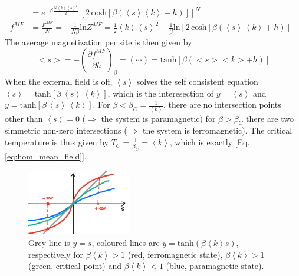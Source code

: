 {\begin{align*}
    &= e^{-\beta \frac{N \left\langle k \right \rangle\left\langle s \right \rangle^2}{2}}\,\left[2\,\text{cosh}\left[\beta(\left\langle s \right \rangle\left\langle k \right \rangle+h)\right]\right]^N \\
   f^{MF}&= \frac{F^{MF}}{N} = - \frac{1}{N\beta}\text{ln}Z^{MF} = \frac{1}{2}\left\langle k \right \rangle\left\langle s \right \rangle^2 -\frac{1}{\beta}\text{ln}\left[2\,\text{cosh}[\beta(\left\langle s \right \rangle\,\left\langle k \right \rangle+h)]\right]
\end{align*}
The average magnetization per site is then given by
\begin{equation*}
    <s> = -\left(\frac{\partial f^{MF}}{\partial h}\right)_\beta = (\cdots) = \text{tanh}[\beta(<s><k>+h)]
\end{equation*}
When the external field is off, $\left\langle s\right\rangle$ solves the self consistent equation $\left\langle s\right\rangle = \text{tanh}[\beta\,\left\langle s\right\rangle\,\left\langle k\right\rangle]$, which is the interesection of $y = \left\langle s\right\rangle$ and $y = \text{tanh}[\beta\,\left\langle s\right\rangle\,\left\langle k\right\rangle]$.
For $\beta < \beta_C = \frac{1}{\left\langle k\right\rangle}$, there are no intersection points other than $\left\langle s \right \rangle = 0$  ($\Rightarrow$ the system is paramagnetic) for $\beta > \beta_C$ there are two simmetric non-zero intersections ($\Rightarrow$ the system is ferromagnetic). The critical temperature is thus given by $T_C = \frac{1}{\beta_C} = \left\langle k \right\rangle$, which is exactly [Eq. \ref{eq:hom_mean_field}].
\begin{figure}[H]
    \centering
    \includegraphics[width = 0.4\textwidth]{latex_source/images/ising/IMG_56FE6CFC861B-1.jpeg}
    \caption{\small Grey line is $y=s$, coloured lines are $y = \text{tanh}(\beta \left\langle k\right\rangle s)$, respectively for $\beta \left\langle k\right\rangle  > 1$ (red, ferromagnetic state), $\beta \left\langle k\right\rangle > 1$ (green, critical point) and $\beta \left\langle k\right\rangle < 1$ (blue, paramagnetic state).}
\end{figure}
}
